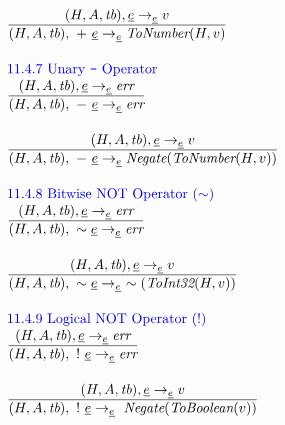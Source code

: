\[\begin{array}{l@{~~}l@{~~}ll}
\frac{\begin{matrix}
\evale, \irexpr \rightarrow_{\ir\expr} v
\end{matrix}}{\begin{matrix}
\state, \ {\tt +}\ \irexpr
\rightarrow_{\ir\expr}
\hf{ToNumber}(H,v)
\end{matrix}}
\\[2em]

\mbox{\inblue 11.4.7 Unary {\tt -} Operator}\\
\frac{\begin{matrix}
\evale, \irexpr \rightarrow_{\ir\expr} \err
\end{matrix}}{\begin{matrix}
\state, \ {\tt -}\ \irexpr
\rightarrow_{\ir\expr}
\err
\end{matrix}}
\\[2em]

\frac{\begin{matrix}
\evale, \irexpr \rightarrow_{\ir\expr} v
\end{matrix}}{\begin{matrix}
\state, \ {\tt -}\ \irexpr
\rightarrow_{\ir\expr}
\hf{Negate}(\hf{ToNumber}(H,v))
\end{matrix}}
\\[2em]

\mbox{\inblue 11.4.8 Bitwise NOT Operator ($\sim$)}\\
\frac{\begin{matrix}
\evale, \irexpr \rightarrow_{\ir\expr} \err
\end{matrix}}{\begin{matrix}
\state, \ \sim \irexpr
\rightarrow_{\ir\expr}
\err
\end{matrix}}
\\[2em]

\frac{\begin{matrix}
\evale, \irexpr \rightarrow_{\ir\expr} v
\end{matrix}}{\begin{matrix}
\state, \ \sim \irexpr
\rightarrow_{\ir\expr}
\ \sim(\hf{ToInt32}(H,v))
\end{matrix}}
\\[2em]

\mbox{\inblue 11.4.9 Logical NOT Operator ($!$)}\\
\frac{\begin{matrix}
\evale, \irexpr \rightarrow_{\ir\expr} \err
\end{matrix}}{\begin{matrix}
\state, \ {\tt !}\ \irexpr
\rightarrow_{\ir\expr}
\err
\end{matrix}}
\\[2em]

\frac{\begin{matrix}
\evale, \irexpr \rightarrow_{\ir\expr} v
\end{matrix}}{\begin{matrix}
\state, \ {\tt !}\ \irexpr
\rightarrow_{\ir\expr}
\ \hf{Negate}(\hf{ToBoolean}(v))
\end{matrix}}
\\[2em]
\end{array}
\]


